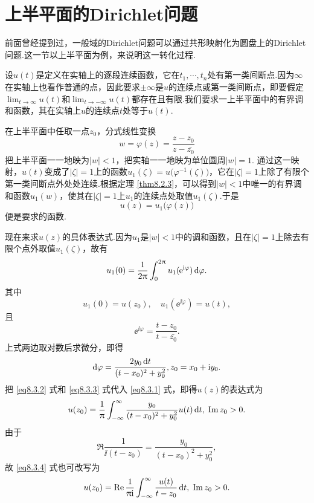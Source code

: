 \section{上半平面的Dirichlet问题\label{sec8.3}}
前面曾经提到过，一般域的Dirichlet问题可以通过共形映射化为圆盘上的Dirichlet问题.这一节以上半平面为例，来说明这一转化过程.

设$u(t)$是定义在实轴上的逐段连续函数，它在$t_1,\cdots,t_n$处有第一类间断点.因为$\infty$在实轴上也看作普通的点，因此要求$\pm\infty$是$u$的连续点或第一类间断点，即要假定$\lim_{t\to\infty}u(t)$和$\lim_{t\to-\infty}u(t)$都存在且有限.我们要求一上半平面中的有界调和函数，其在实轴上$u$的连续点$t$处等于$u(t)$.

在上半平面中任取一点$z_0$，分式线性变换
\[w=\varphi(z)=\frac{z-z_0}{z-\bar{z_0}}\]
把上半平面一一地映为$|w|<1$，把实轴一一地映为单位圆周$|w|=1$. 通过这一映射，$u(t)$变成了$|\zeta|=1$上的函数$u_1(\zeta)=u\big(\varphi^{-1}(\zeta)\big)$，它在$|\zeta|=1$上除了有限个第一类间断点外处处连续.根据定理 \ref{thm8.2.3}，可以得到$|w|<1$中唯一的有界调和函数$u_1(w)$，使其在$|\zeta|=1$上$u_1$的连续点处取值$u_1(\zeta)$.于是
\[u(z)=u_1\big(\varphi(z)\big)\]
便是要求的函数.

现在来求$u(z)$的具体表达式.因为$u_1$是$|w|<1$中的调和函数，且在$|\zeta|=1$上除去有限个点外取值$u_1(\zeta)$，故有
\begin{equation}\label{eq8.3.1}
u_1(0)=\frac1{2\uppi}\int_0^{2\uppi}u_1(\operatorname{\!\!\;\mathrm e}^{\mathrm i\varphi})\mathop{}\!\mathrm{d} \varphi.
\end{equation}
其中
\begin{equation}\label{eq8.3.2}
u_1(0)=u(z_0),\quad u_1(\ee^{\ii\varphi})=u(t),
\end{equation}
且
\[\ee^{\ii\varphi}=\frac{t-z_0}{t-\bar{z_0}}.\]
上式两边取对数后求微分，即得
\begin{equation}\label{eq8.3.3}
\mathop{}\!\mathrm{d} \varphi=\frac{2y_0\mathop{}\!\mathrm{d} t}{(t-x_0)^2+y_0^2},z_0=x_0+\mathrm i y_0.
\end{equation}
把 \eqref{eq8.3.2} 式和 \eqref{eq8.3.3} 式代入 \eqref{eq8.3.1} 式，即得$u(z)$的表达式为
\begin{equation}\label{eq8.3.4}
u(z_0)=\frac1{\uppi}\int_{-\infty}^\infty\frac{y_0}{(t-x_0)^2+y_0^2}u(t)\mathop{}\!\mathrm{d} t,\;\operatorname{Im} z_0>0.
\end{equation}
由于
\[\Re\frac1{\ii(t-z_0)}=\frac{y_0}{(t-x_0)^2+y_0^2},\]
故 \eqref{eq8.3.4} 式也可改写为
\begin{equation}\label{eq8.3.5}
u(z_0)=\operatorname{Re}\frac1{\uppi\mathrm i}\int_{-\infty}^\infty\frac{u(t)}{t-z_0}\mathop{}\!\mathrm{d} t,\;\operatorname{Im} z_0>0.
\end{equation}

